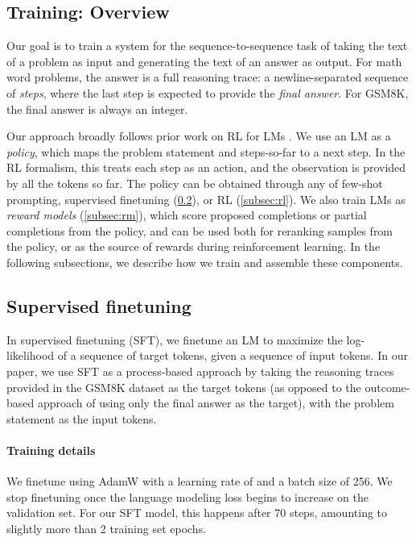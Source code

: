 \documentclass[11pt, a4paper, logo]{deepmind}
\begin{document}
\subsection{Training: Overview}
\label{sec:training_overview}


Our goal is to train a system for the sequence-to-sequence task \citep{sutskever2014sequence} of taking the text of a problem as input and generating the text of an answer as output.
For math word problems, the answer is a full reasoning trace: a newline-separated sequence of \emph{steps}, where the last step is expected to provide the \emph{final answer}.
For GSM8K, the final answer is always an integer.

Our approach broadly follows prior work on RL for LMs \citep{ziegler2019fine, nakano2021webgpt, menick2022teaching}.
We use an LM as a \emph{policy}, which maps the problem statement and steps-so-far to a next step.
In the RL formalism, this treats each step as an action, and the observation is provided by all the tokens so far.
The policy can be obtained through any of few-shot prompting, supervised finetuning (\cref{subsec:sft}), or RL (\cref{subsec:rl}).
We also train LMs as \emph{reward models} (\cref{subsec:rm}), which score proposed completions or partial completions from the policy, and can be used both for reranking samples from the policy, or as the source of rewards during reinforcement learning.
In the following subsections, we describe how we train and assemble these components.


\subsection{Supervised finetuning}
\label{subsec:sft}
In supervised finetuning (SFT), we finetune an LM to maximize the log-likelihood of a sequence of target tokens, given a sequence of input tokens.
In our paper, we use SFT as a process-based approach by taking the reasoning traces provided in the GSM8K dataset as the target tokens (as opposed to the outcome-based approach of using only the final answer as the target), with the problem statement as the input tokens.

\paragraph{Training details}
We finetune using AdamW \citep{loshchilov2017decoupled} with a learning rate of  and a batch size of 256. We stop finetuning once the language modeling loss begins to increase on the validation set.
For our SFT model, this happens after 70 steps, amounting to slightly more than 2 training set epochs. 
\end{document}
